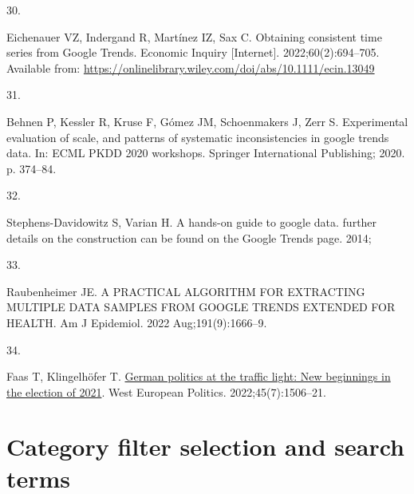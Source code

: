 \documentclass[
  letterpaper,
  DIV=11,
  numbers=noendperiod]{scrartcl}
\newlength{\cslhangindent}
\newlength{\csllabelwidth}
\newlength{\cslentryspacingunit} %
\newenvironment{CSLReferences}[2] %
 {%
  \setlength{\parindent}{0pt}
  \ifodd #1
  \let\oldpar\par
  \def\par{\hangindent=\cslhangindent\oldpar}
  \fi
  \setlength{\parskip}{#2\cslentryspacingunit}
 }%
 {}
\newcommand{\CSLLeftMargin}[1]{\parbox[t]{\csllabelwidth}{#1}}
\newcommand{\CSLRightInline}[1]{\parbox[t]{\linewidth - \csllabelwidth}{#1}\break}
\newcommand{\beginsupplement}{\setcounter{section}{0} \renewcommand{\thesection}{A\arabic{section}}  \setcounter{table}{0}  \renewcommand{\thetable}{A\arabic{table}} \setcounter{figure}{0} \renewcommand{\thefigure}{A\arabic{figure}}}
\begin{document}
\begin{CSLReferences}{0}{0}
\leavevmode{}%
\CSLLeftMargin{30. }%
\CSLRightInline{Eichenauer VZ, Indergand R, Martínez IZ, Sax C.
Obtaining consistent time series from {Google} {Trends}. Economic
Inquiry {[}Internet{]}. 2022;60(2):694--705. Available from:
\url{https://onlinelibrary.wiley.com/doi/abs/10.1111/ecin.13049}}

\leavevmode{}%
\CSLLeftMargin{31. }%
\CSLRightInline{Behnen P, Kessler R, Kruse F, Gómez JM, Schoenmakers J,
Zerr S. Experimental evaluation of scale, and patterns of systematic
inconsistencies in google trends data. In: {ECML} {PKDD} 2020 workshops.
Springer International Publishing; 2020. p. 374--84. }

\leavevmode{}%
\CSLLeftMargin{32. }%
\CSLRightInline{Stephens-Davidowitz S, Varian H. A hands-on guide to
google data. further details on the construction can be found on the
Google Trends page. 2014; }

\leavevmode{}%
\CSLLeftMargin{33. }%
\CSLRightInline{Raubenheimer JE. A {PRACTICAL} {ALGORITHM} {FOR}
{EXTRACTING} {MULTIPLE} {DATA} {SAMPLES} {FROM} {GOOGLE} {TRENDS}
{EXTENDED} {FOR} {HEALTH}. Am J Epidemiol. 2022 Aug;191(9):1666--9. }

\leavevmode{}%
\CSLLeftMargin{34. }%
\CSLRightInline{Faas T, Klingelhöfer T.
\href{https://doi.org/10.1080/01402382.2022.2045783}{German politics at
the traffic light: New beginnings in the election of 2021}. West
European Politics. 2022;45(7):1506--21. }

\end{CSLReferences}

\newpage


\beginsupplement

\hypertarget{sec-categoryfilterselection}{%
\section{Category filter selection and search
terms}\label{sec-categoryfilterselection}}
\end{document}
